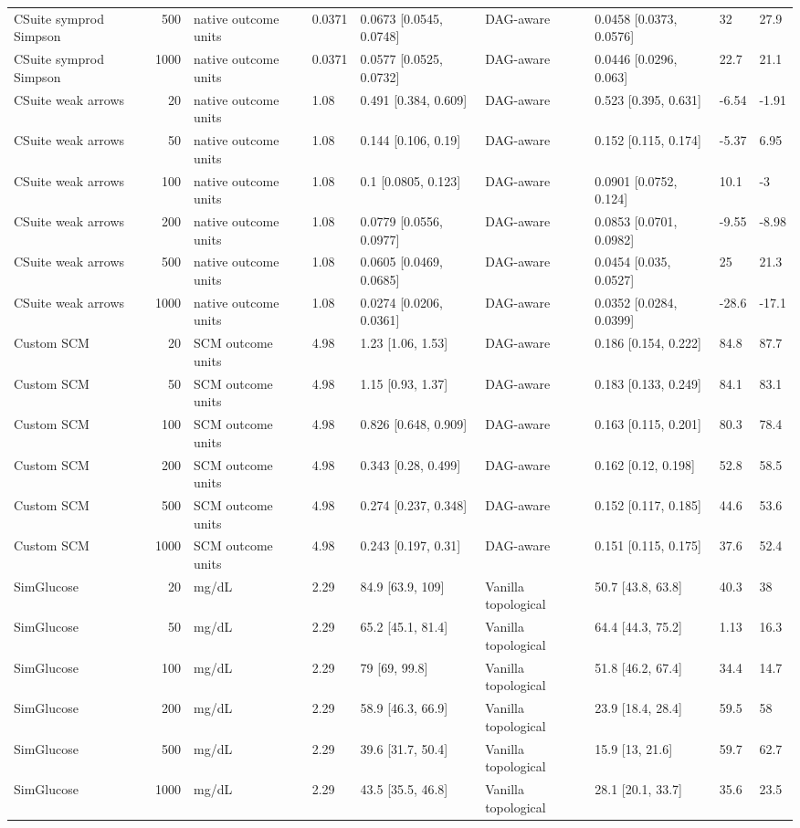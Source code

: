 \begin{tabular}{lrlllllll}
CSuite symprod Simpson & 500 & native outcome units & 0.0371 & 0.0673 [0.0545, 0.0748] & DAG-aware & 0.0458 [0.0373, 0.0576] & 32 & 27.9 \\
CSuite symprod Simpson & 1000 & native outcome units & 0.0371 & 0.0577 [0.0525, 0.0732] & DAG-aware & 0.0446 [0.0296, 0.063] & 22.7 & 21.1 \\
CSuite weak arrows & 20 & native outcome units & 1.08 & 0.491 [0.384, 0.609] & DAG-aware & 0.523 [0.395, 0.631] & -6.54 & -1.91 \\
CSuite weak arrows & 50 & native outcome units & 1.08 & 0.144 [0.106, 0.19] & DAG-aware & 0.152 [0.115, 0.174] & -5.37 & 6.95 \\
CSuite weak arrows & 100 & native outcome units & 1.08 & 0.1 [0.0805, 0.123] & DAG-aware & 0.0901 [0.0752, 0.124] & 10.1 & -3 \\
CSuite weak arrows & 200 & native outcome units & 1.08 & 0.0779 [0.0556, 0.0977] & DAG-aware & 0.0853 [0.0701, 0.0982] & -9.55 & -8.98 \\
CSuite weak arrows & 500 & native outcome units & 1.08 & 0.0605 [0.0469, 0.0685] & DAG-aware & 0.0454 [0.035, 0.0527] & 25 & 21.3 \\
CSuite weak arrows & 1000 & native outcome units & 1.08 & 0.0274 [0.0206, 0.0361] & DAG-aware & 0.0352 [0.0284, 0.0399] & -28.6 & -17.1 \\
Custom SCM & 20 & SCM outcome units & 4.98 & 1.23 [1.06, 1.53] & DAG-aware & 0.186 [0.154, 0.222] & 84.8 & 87.7 \\
Custom SCM & 50 & SCM outcome units & 4.98 & 1.15 [0.93, 1.37] & DAG-aware & 0.183 [0.133, 0.249] & 84.1 & 83.1 \\
Custom SCM & 100 & SCM outcome units & 4.98 & 0.826 [0.648, 0.909] & DAG-aware & 0.163 [0.115, 0.201] & 80.3 & 78.4 \\
Custom SCM & 200 & SCM outcome units & 4.98 & 0.343 [0.28, 0.499] & DAG-aware & 0.162 [0.12, 0.198] & 52.8 & 58.5 \\
Custom SCM & 500 & SCM outcome units & 4.98 & 0.274 [0.237, 0.348] & DAG-aware & 0.152 [0.117, 0.185] & 44.6 & 53.6 \\
Custom SCM & 1000 & SCM outcome units & 4.98 & 0.243 [0.197, 0.31] & DAG-aware & 0.151 [0.115, 0.175] & 37.6 & 52.4 \\
SimGlucose & 20 & mg/dL & 2.29 & 84.9 [63.9, 109] & Vanilla topological & 50.7 [43.8, 63.8] & 40.3 & 38 \\
SimGlucose & 50 & mg/dL & 2.29 & 65.2 [45.1, 81.4] & Vanilla topological & 64.4 [44.3, 75.2] & 1.13 & 16.3 \\
SimGlucose & 100 & mg/dL & 2.29 & 79 [69, 99.8] & Vanilla topological & 51.8 [46.2, 67.4] & 34.4 & 14.7 \\
SimGlucose & 200 & mg/dL & 2.29 & 58.9 [46.3, 66.9] & Vanilla topological & 23.9 [18.4, 28.4] & 59.5 & 58 \\
SimGlucose & 500 & mg/dL & 2.29 & 39.6 [31.7, 50.4] & Vanilla topological & 15.9 [13, 21.6] & 59.7 & 62.7 \\
SimGlucose & 1000 & mg/dL & 2.29 & 43.5 [35.5, 46.8] & Vanilla topological & 28.1 [20.1, 33.7] & 35.6 & 23.5 \\
\bottomrule
\end{tabular}
